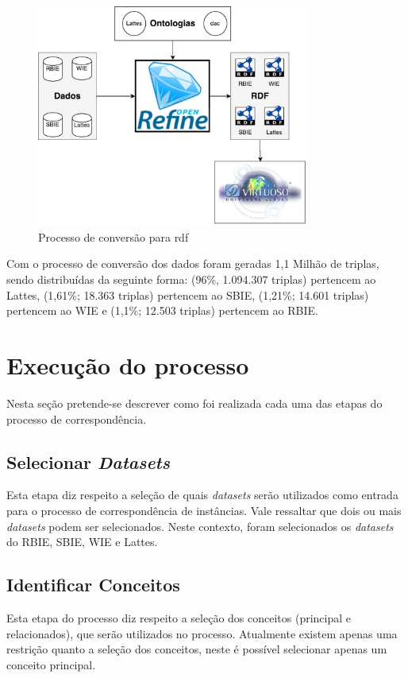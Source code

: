 \begin{figure}[!ht]
	\centering
	\includegraphics[width=0.8\textwidth]{./imagens/conversao.pdf}
	\caption{Processo de conversão para rdf}
	\label{fig:conversao}
\end{figure}

Com o processo de conversão dos dados foram geradas 1,1 Milhão de triplas, sendo distribuídas da seguinte forma: (96\%, 1.094.307 triplas) pertencem ao Lattes, (1,61\%; 18.363 triplas) pertencem ao SBIE, (1,21\%; 14.601 triplas) pertencem ao WIE e (1,1\%; 12.503 triplas) pertencem ao RBIE.

\newpage
\section{Execução do processo}
Nesta seção pretende-se descrever como foi realizada cada uma das etapas do processo de correspondência. 

\subsection{Selecionar \textit{Datasets}}
\label{sub:selecionar_datasets}
Esta etapa diz respeito a seleção de quais \textit{datasets} serão utilizados como entrada para o processo de correspondência de instâncias. Vale ressaltar que dois ou mais \textit{datasets} podem ser selecionados. Neste contexto, foram selecionados os \textit{datasets} do RBIE, SBIE, WIE e Lattes.
  
\subsection{Identificar Conceitos}
Esta etapa do processo diz respeito a seleção dos conceitos (principal e relacionados), que serão utilizados no processo. Atualmente existem apenas uma restrição quanto a seleção dos conceitos, neste é possível selecionar apenas um conceito principal.

